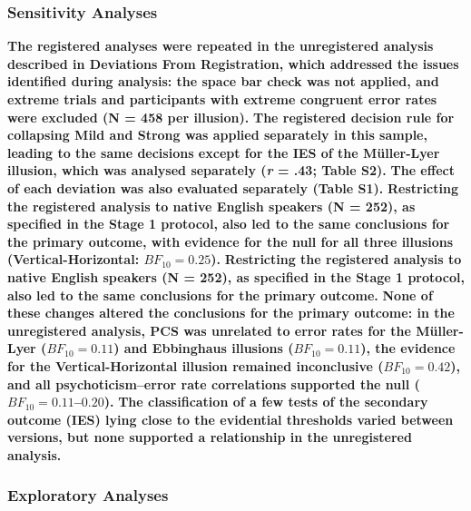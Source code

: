 \documentclass[
  man,
  floatsintext,
  longtable,
  nolmodern,
  notxfonts,
  notimes,
  colorlinks=true,linkcolor=blue,citecolor=blue,urlcolor=blue]{apa7}
\newcounter{none} %
\begin{document}
\subsubsection{Sensitivity Analyses}\label{sensitivity-analyses}

\textbf{The registered analyses were repeated in the unregistered
analysis described in Deviations From Registration, which addressed the
issues identified during analysis: the space bar check was not applied,
and extreme trials and participants with extreme congruent error rates
were excluded (N = 458 per illusion).} \textbf{The registered decision
rule for collapsing Mild and Strong was applied separately in this
sample, leading to the same decisions except for the IES of the
Müller-Lyer illusion, which was analysed separately (\emph{r} = .43;
Table S2).} \textbf{The effect of each deviation was also evaluated
separately (Table S1).} \textbf{Restricting the registered analysis to
native English speakers (N = 252), as specified in the Stage 1 protocol,
also led to the same conclusions for the primary outcome, with evidence
for the null for all three illusions (Vertical-Horizontal:
\(BF_{10} = 0.25\)).} \textbf{Restricting the registered analysis to
native English speakers (N = 252), as specified in the Stage 1 protocol,
also led to the same conclusions for the primary outcome.} \textbf{None
of these changes altered the conclusions for the primary outcome: in the
unregistered analysis, PCS was unrelated to error rates for the
Müller-Lyer (\(BF_{10} = 0.11\)) and Ebbinghaus illusions
(\(BF_{10} = 0.11\)), the evidence for the Vertical-Horizontal illusion
remained inconclusive (\(BF_{10} = 0.42\)), and all psychoticism--error
rate correlations supported the null (\(BF_{10} = 0.11\)--\(0.20\)).}
\textbf{The classification of a few tests of the secondary outcome (IES)
lying close to the evidential thresholds varied between versions, but
none supported a relationship in the unregistered analysis.}

\subsubsection{Exploratory Analyses}\label{exploratory-analyses}
\end{document}
